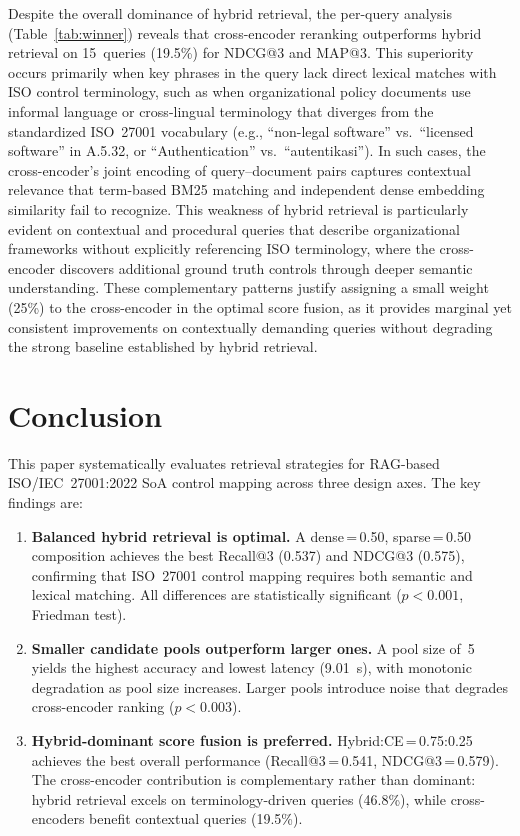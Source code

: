 \documentclass[conference]{IEEEtran}
\begin{document}
Despite the overall dominance of hybrid retrieval, the per-query analysis
(Table~\ref{tab:winner}) reveals that cross-encoder reranking outperforms
hybrid retrieval on 15~queries (19.5\%) for NDCG@3 and MAP@3. This
superiority occurs primarily when key phrases in the query lack direct
lexical matches with ISO control terminology, such as when
organizational policy documents use informal language or
cross-lingual terminology that diverges from the standardized ISO~27001
vocabulary (e.g., ``non-legal software'' vs.\ ``licensed software'' in
A.5.32, or ``Authentication'' vs.\ ``autentikasi''). In such cases, the
cross-encoder's joint encoding of query--document pairs captures contextual
relevance that term-based BM25 matching and independent dense embedding
similarity fail to recognize. This weakness of hybrid retrieval is
particularly evident on contextual and procedural queries that describe
organizational frameworks without explicitly referencing ISO terminology,
where the cross-encoder discovers additional ground truth controls through
deeper semantic understanding. These complementary patterns justify
assigning a small weight (25\%) to the cross-encoder in the optimal
score fusion, as it provides marginal yet consistent improvements on
contextually demanding queries without degrading the strong baseline
established by hybrid retrieval.

\section{Conclusion}

This paper systematically evaluates retrieval strategies for RAG-based
ISO/IEC~27001:2022 SoA control mapping across three design axes. The key
findings are:

\begin{enumerate}
\item \textbf{Balanced hybrid retrieval is optimal.}
A dense\,=\,0.50, sparse\,=\,0.50 composition achieves the best
Recall@3 (0.537) and NDCG@3 (0.575), confirming that ISO~27001
control mapping requires both semantic and lexical matching. All
differences are statistically significant ($p < 0.001$, Friedman test).

\item \textbf{Smaller candidate pools outperform larger ones.} A pool
size of~5 yields the highest accuracy and lowest latency (9.01~s), with
monotonic degradation as pool size increases. Larger pools introduce noise
that degrades cross-encoder ranking ($p < 0.003$).

\item \textbf{Hybrid-dominant score fusion is preferred.}
Hybrid:CE\,=\,0.75:0.25 achieves the best overall performance
(Recall@3\,=\,0.541, NDCG@3\,=\,0.579). The cross-encoder contribution
is complementary rather than dominant: hybrid retrieval excels on
terminology-driven queries (46.8\%), while cross-encoders benefit
contextual queries (19.5\%).
\end{enumerate}
\end{document}
